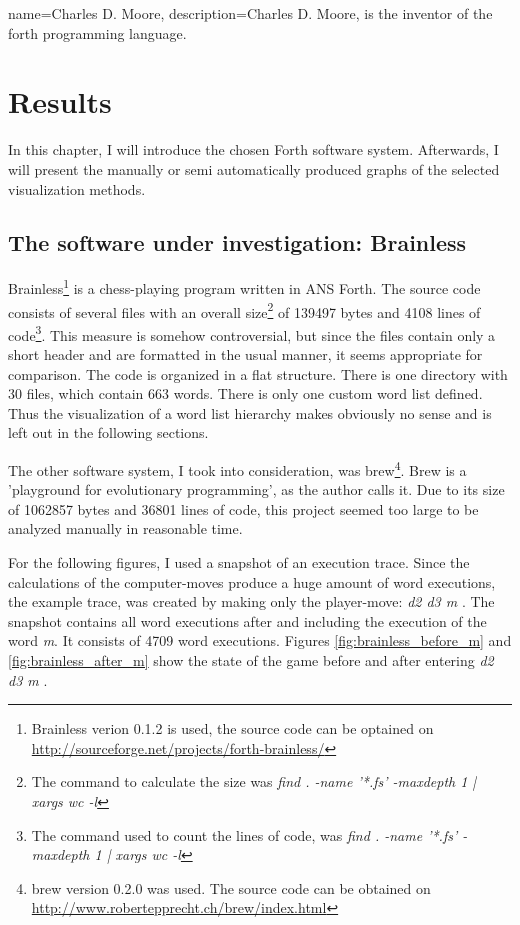 {
  name={Charles D. Moore},
  description={Charles D. Moore, is the inventor of the forth programming language.}
}

\chapter{Results}
\label{chap:Results}

In this chapter, I will introduce the chosen Forth software system. Afterwards, I will present the manually or semi automatically produced graphs of the selected visualization methods.

\section{The software under investigation: Brainless}

Brainless\footnote{Brainless verion 0.1.2 is used, the source code can be optained on \url{http://sourceforge.net/projects/forth-brainless/}} is a chess-playing program written in ANS Forth. The source code consists of several files with an overall size\footnote{The command to calculate the size was \emph{find . -name '*.fs' -maxdepth 1 | xargs wc -l}} of 139497 bytes and 4108 lines of code\footnote{The command used to count the lines of code, was \emph{find . -name '*.fs' -maxdepth 1 | xargs wc -l}}.
This measure is somehow controversial, but since the files contain only a short header and are formatted in the usual manner, it seems appropriate for comparison. The code is organized in a flat structure. There is one directory with 30 files, which contain 663 words. There is only one custom word list defined. Thus the visualization of a word list hierarchy makes obviously no sense and is left out in the following sections.

The other software system, I took into consideration, was brew\footnote{brew version 0.2.0 was used. The source code can be obtained on \url{http://www.robertepprecht.ch/brew/index.html}}. Brew is a 'playground for evolutionary programming', as the author calls it. Due to its size of 1062857 bytes and 36801 lines of code, this project seemed too large to be analyzed manually in reasonable time.

For the following figures, I used a snapshot of an execution trace.
Since the calculations of the computer-moves produce a huge amount of word executions, the example trace, was created by making only the player-move: \emph{d2 d3 m} \keys{\return}. The snapshot contains all word executions after and including the execution of the word \emph{m}. It consists of 4709 word executions. Figures \ref{fig:brainless_before_m} and \ref{fig:brainless_after_m} show the state of the game before and after entering \emph{d2 d3 m} \keys{\return}.

